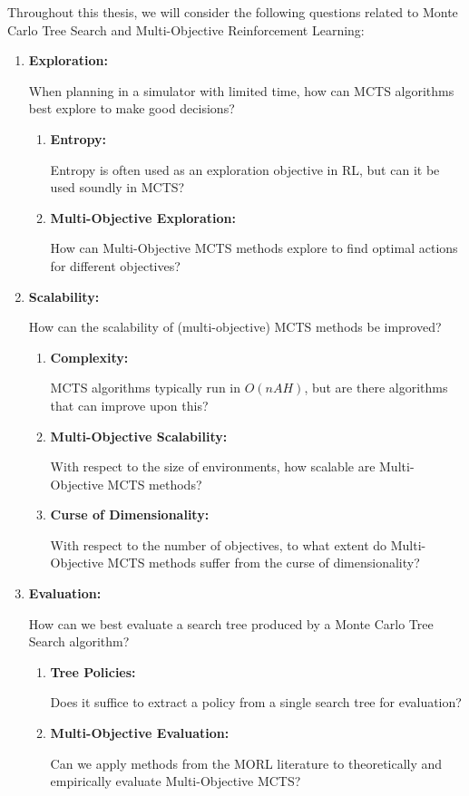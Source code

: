     Throughout this thesis, we will consider the following questions related to Monte Carlo Tree Search and Multi-Objective Reinforcement Learning:
    \begin{enumerate}[start=1, label={\textbf{Q\arabic* -}}]
        \item \hypertarget{q1}{\textbf{Exploration:}} When planning in a simulator with limited time, how can MCTS algorithms best explore to make good decisions?
        
        \begin{enumerate}[start=1, label={\textbf{Q1.\arabic* -}}]
            \item \hypertarget{q11}{\textbf{Entropy:}} Entropy is often used as an exploration objective in RL, but can it be used soundly in MCTS?
            \item \hypertarget{q12}{\textbf{Multi-Objective Exploration:}} How can Multi-Objective MCTS methods explore to find optimal actions for different objectives? 
        \end{enumerate}

        \item \hypertarget{q2}{\textbf{Scalability:}} How can the scalability of (multi-objective) MCTS methods be improved?

        \begin{enumerate}[start=1, label={\textbf{Q2.\arabic* -}}]
            \item \hypertarget{q21}{\textbf{Complexity:}} MCTS algorithms typically run in $O(nAH)$, but are there algorithms that can improve upon this?
            \item \hypertarget{q22}{\textbf{Multi-Objective Scalability:}} With respect to the size of environments, how scalable are Multi-Objective MCTS methods?
            \item \hypertarget{q23}{\textbf{Curse of Dimensionality:}} With respect to the number of objectives, to what extent do Multi-Objective MCTS methods suffer from the curse of dimensionality?
        \end{enumerate}


        \item \hypertarget{q3}{\textbf{Evaluation:}} How can we best evaluate a search tree produced by a Monte Carlo Tree Search algorithm?
        
        \begin{enumerate}[start=1, label={\textbf{Q3.\arabic* -}}]
            \item \hypertarget{q31}{\textbf{Tree Policies:}} Does it suffice to extract a policy from a single search tree for evaluation? 
            \item \hypertarget{q32}{\textbf{Multi-Objective Evaluation:}} Can we apply methods from the MORL literature to theoretically and empirically evaluate Multi-Objective MCTS?
        \end{enumerate}
    \end{enumerate}

